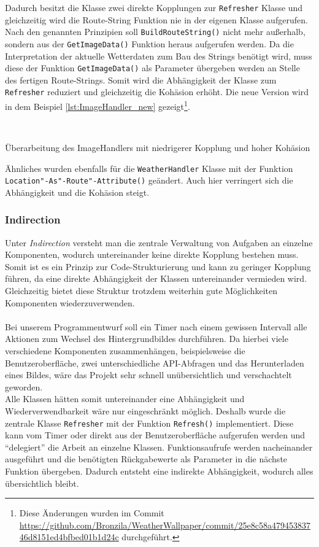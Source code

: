 Dadurch besitzt die Klasse zwei direkte Kopplungen zur \texttt{Refresher} Klasse und gleichzeitig wird die Route-String Funktion nie in der eigenen Klasse aufgerufen.
Nach den genannten Prinzipien soll \texttt{BuildRouteString()} nicht mehr außerhalb, sondern aus der \texttt{GetImageData()} Funktion heraus aufgerufen werden. 
Da die Interpretation der aktuelle Wetterdaten zum Bau des Strings benötigt wird, muss diese der Funktion \texttt{GetImageData()} als Parameter übergeben werden an Stelle des fertigen Route-Strings.
Somit wird die Abhängigkeit der Klasse zum \texttt{Refresher} reduziert und gleichzeitig die Kohäsion erhöht.
Die neue Version wird in dem Beispiel \ref{lst:ImageHandler_new} gezeigt\footnote{Diese Änderungen wurden im Commit \url{https://github.com/Bronzila/WeatherWallpaper/commit/25e8c58a47945383746d8151ed4bfbed01b1d24c} durchgeführt.}.\\
\\
\begin{listing}[htb]
	\inputminted[linenos=true,frame=lines]{csharp}{Listings/ImageHandler_new.cs}
	\caption{Überarbeitung des ImageHandlers mit niedrigerer Kopplung und hoher Kohäsion}
	\label{lst:ImageHandler_new}
\end{listing}
Ähnliches wurden ebenfalls für die \texttt{WeatherHandler} Klasse mit der Funktion \texttt{Location"-As"-Route"-Attribute()} geändert.
Auch hier verringert sich die Abhängigkeit und die Kohäsion steigt.

\subsubsection{Indirection}
Unter \textit{Indirection} versteht man die zentrale Verwaltung von Aufgaben an einzelne Komponenten, wodurch untereinander keine direkte Kopplung bestehen muss.
Somit ist es ein Prinzip zur Code-Strukturierung und kann zu geringer Kopplung führen, da eine direkte Abhängigkeit der Klassen untereinander vermieden wird.
Gleichzeitig bietet diese Struktur trotzdem weiterhin gute Möglichkeiten Komponenten wiederzuverwenden.\\
\\
Bei unserem Programmentwurf soll ein Timer nach einem gewissen Intervall alle Aktionen zum Wechsel des Hintergrundbildes durchführen.
Da hierbei viele verschiedene Komponenten zusammenhängen, beispielsweise die Benutzeroberfläche, zwei unterschiedliche API-Abfragen und das Herunterladen eines Bildes, wäre das Projekt sehr schnell unübersichtlich und verschachtelt geworden.\\
Alle Klassen hätten somit untereinander eine Abhängigkeit und Wiederverwendbarkeit wäre nur eingeschränkt möglich.
Deshalb wurde die zentrale Klasse \texttt{Refresher} mit der Funktion \texttt{Refresh()} implementiert.
Diese kann vom Timer oder direkt aus der Benutzeroberfläche aufgerufen werden und \enquote{delegiert} die Arbeit an einzelne Klassen.
Funktionsaufrufe werden nacheinander ausgeführt und die benötigten Rückgabewerte als Parameter in die nächste Funktion übergeben.
Dadurch entsteht eine indirekte Abhängigkeit, wodurch alles übersichtlich bleibt.
